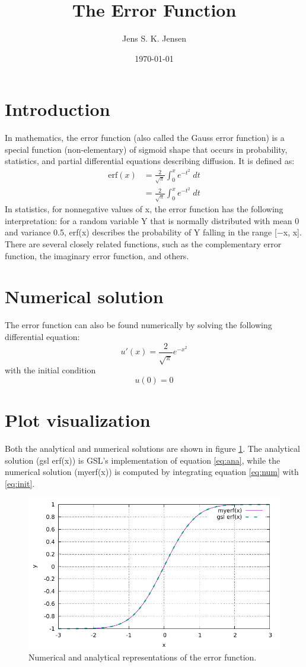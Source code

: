\documentclass{article}
\begin{document}
\title{The Error Function}
\author{Jens S. K. Jensen}
\date{\today}
\maketitle

\section{Introduction}
In mathematics, the error function (also called the Gauss error function) is a special function (non-elementary) of sigmoid shape that occurs in probability, statistics, and partial differential equations describing diffusion. It is defined as:
\begin{align}
	\text{erf}(x) &= \frac{2}{\sqrt{\pi}} \int_0^x e^{-t^2}\;dt \\
	&= \frac{2}{\sqrt{\pi}} \int_0^x e^{-t^2}\;dt
	\label{eq:ana}
\end{align}
In statistics, for nonnegative values of x, the error function has the following interpretation: for a random variable Y that is normally distributed with mean 0 and variance 0.5, erf(x) describes the probability of Y falling in the range [−x, x]. There are several closely related functions, such as the complementary error function, the imaginary error function, and others.

\section{Numerical solution}
The error function can also be found numerically by solving the following differential equation:
\begin{equation}
	u'(x) = \frac{2}{\sqrt{\pi}}e^{-x^2}
	\label{eq:num}
\end{equation}
with the initial condition
\begin{equation}
	u(0) = 0
	\label{eq:init}
\end{equation}

\section{Plot visualization}

Both the analytical and numerical solutions are shown in figure \ref{fig:plot}. The analytical solution (gsl erf(x)) is GSL's implementation of equation \ref{eq:ana}, while the numerical solution (myerf(x)) is computed by integrating equation \ref{eq:num} with \ref{eq:init}.

\begin{figure}[t]
	\centering
	\includegraphics{plot.pdf}
	\caption{Numerical and analytical representations of the error function.}
	\label{fig:plot}
\end{figure}
\end{document}
